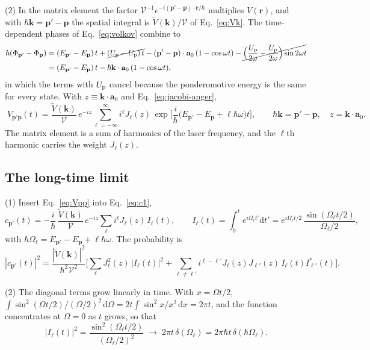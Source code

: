 \documentclass[11pt]{article}
\numberwithin{equation}{section}
\newcommand{\Vol}{\mathcal V}
\newcommand{\av}{\mathbf a_0}
\newcommand{\kv}{\mathbf k}
\newcommand{\pv}{\mathbf p}
\newcommand{\rv}{\mathbf r}
\newcommand{\Up}{U_{\rm p}}
\newcommand{\dd}{\mathrm d}
\begin{document}
{\noindent}(2) In the matrix element the factor $\Vol^{-1}e^{-i(\pv'-\pv)\cdot\rv/\hbar}$
multiplies $V(\rv)$, and with $\hbar\kv=\pv'-\pv$ the spatial integral is
$\tilde V(\kv)/\Vol$ of Eq.~\eqref{eq:Vk}. The time-dependent phases of
Eq.~\eqref{eq:volkov} combine to
\begin{equation}
\begin{aligned}
\hbar(\Phi_{\pv'}-\Phi_{\pv})&=(E_{\pv'}-E_{\pv})\,t+\cancel{(\Up-\Up)\,t}
-(\pv'-\pv)\cdot\av\,(1-\cos\omega t)-\cancel{\Big(\frac{\Up}{2\omega}-\frac{\Up}{2\omega}\Big)\sin2\omega t}\\
&=(E_{\pv'}-E_{\pv})\,t-\hbar\kv\cdot\av\,(1-\cos\omega t),
\end{aligned}
\end{equation}
in which the terms with $\Up$ cancel because the ponderomotive energy is the
same for every state. With
$z\equiv\kv\cdot\av$ and Eq.~\eqref{eq:jacobi-anger},
\begin{equation}
\boxed{\;V_{\pv'\pv}(t)=\frac{\tilde V(\kv)}{\Vol}\,e^{-iz}\sum_{\ell=-\infty}^{\infty}i^\ell J_\ell(z)\,
\exp\Big[\frac i\hbar\big(E_{\pv'}-E_{\pv}+\ell\hbar\omega\big)t\Big],\qquad
\hbar\kv=\pv'-\pv,\quad z=\kv\cdot\av.\;}
\label{eq:Vpp}
\end{equation}
The matrix element is a sum of harmonics of the laser frequency, and the
$\ell$th harmonic carries the weight $J_\ell(z)$.

\subsection{The long-time limit}
{\noindent}(1) Insert Eq.~\eqref{eq:Vpp} into Eq.~\eqref{eq:c1},
\begin{equation}
c_{\pv'}(t)=-\frac{i}{\hbar}\,\frac{\tilde V(\kv)}{\Vol}\,e^{-iz}\sum_\ell i^\ell J_\ell(z)\,I_\ell(t),\qquad
I_\ell(t)=\int_0^te^{i\Omega_\ell t'}\dd t'=e^{i\Omega_\ell t/2}\,\frac{\sin(\Omega_\ell t/2)}{\Omega_\ell/2},
\end{equation}
with $\hbar\Omega_\ell=E_{\pv'}-E_{\pv}+\ell\hbar\omega$. The probability is
\begin{equation}
|c_{\pv'}(t)|^2=\frac{|\tilde V(\kv)|^2}{\hbar^2\Vol^2}\Big[\sum_\ell J_\ell^2(z)\,|I_\ell(t)|^2
+\sum_{\ell\neq\ell'}i^{\ell-\ell'}J_\ell(z)J_{\ell'}(z)\,I_\ell(t)I^*_{\ell'}(t)\Big].
\end{equation}

{\noindent}(2) The diagonal terms grow linearly in time. With
$x=\Omega t/2$, $\int\sin^2(\Omega t/2)/(\Omega/2)^2\,\dd\Omega
=2t\int\sin^2x/x^2\,\dd x=2\pi t$, and the function concentrates at $\Omega=0$
as $t$ grows, so that
\begin{equation}
|I_\ell(t)|^2=\frac{\sin^2(\Omega_\ell t/2)}{(\Omega_\ell/2)^2}\;\longrightarrow\;2\pi t\,\delta(\Omega_\ell)
=2\pi\hbar t\,\delta(\hbar\Omega_\ell).
\end{equation}
\end{document}
